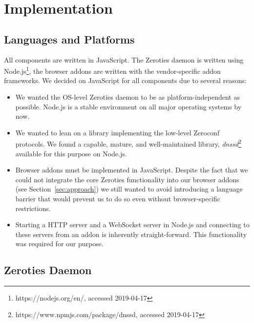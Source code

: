 \section{Implementation}
\label{sec:implementation}

\subsection{Languages and Platforms}
\label{sub:languages_and_platforms}

All components are written in JavaScript. 
The Zeroties daemon is written using Node.js\footnote{https://nodejs.org/en/, accessed 2019-04-17}, the browser addons are written with the vendor-specific addon frameworks.
We decided on JavaScript for all components due to several reasons:
\begin{itemize}
\item We wanted the OS-level Zeroties daemon to be as platform-independent as possible. 
Node.js is a stable environment on all major operating systems by now.
\item We wanted to lean on a library implementing the low-level Zeroconf protocols.
We found a capable, mature, and well-maintained library, \textit{dnssd}\footnote{https://www.npmjs.com/package/dnssd, accessed 2019-04-17} available for this purpose on Node.js.
\item Browser addons must be implemented in JavaScript.
Despite the fact that we could not integrate the core Zeroties functionality into our browser addons (see Section~\ref{sec:approach}) we still wanted to avoid  introducing a language barrier that would prevent us to do so even without browser-specific restrictions.
\item Starting a HTTP server and a WebSocket server in Node.js and connecting to these servers from an addon is inherently straight-forward.
This functionality was required for our purpose.
\end{itemize}

\subsection{Zeroties Daemon}
\label{sub:zeroties_daemon}

